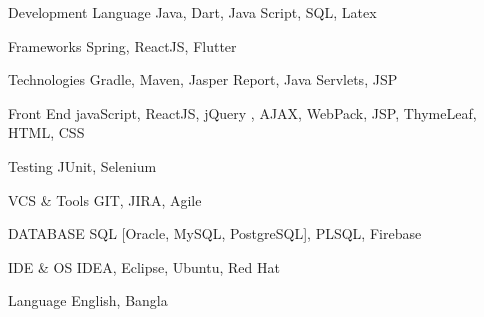 




\begin{cvskills}
	
	\cvskill
	{Development Language} %
	{Java, Dart, Java Script, SQL, Latex} %
	
	
	\cvskill
	{Frameworks} %
	{Spring, ReactJS, Flutter} %
	
	\cvskill
	{Technologies} %
	{Gradle, Maven, Jasper Report, Java Servlets, JSP} %
	
	\cvskill
	{Front End} %
	{javaScript, ReactJS, jQuery , AJAX, WebPack, JSP, ThymeLeaf, HTML, CSS} %
	
	\cvskill
	{Testing} %
	{JUnit, Selenium} %
	
	\cvskill
	{VCS \&  Tools} %
	{GIT, JIRA, Agile} %
	
	\cvskill
	{DATABASE} %
	{SQL [Oracle, MySQL, PostgreSQL], PLSQL, Firebase} %
	
	
	\cvskill
	{IDE \& OS} %
	{IDEA, Eclipse, Ubuntu, Red Hat} %
	
	
	
	\cvskill
	{Language} %
	{English, Bangla} %
	
\end{cvskills}
